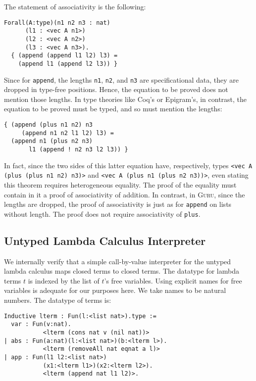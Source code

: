 \documentclass[preprint,natbib]{sigplanconf}
\newcommand{\guru}[0]{\textsc{Guru}}
\begin{document}
The statement of associativity is the following:

{\begin{verbatim}
Forall(A:type)(n1 n2 n3 : nat)
      (l1 : <vec A n1>)
      (l2 : <vec A n2>)
      (l3 : <vec A n3>).
  { (append (append l1 l2) l3) =
    (append l1 (append l2 l3)) }
\end{verbatim}}

\noindent Since for \texttt{append}, the lengths
\texttt{n1}, \texttt{n2}, and \texttt{n3} are specificational data,
they are dropped in type-free positions.  Hence, the equation to be
proved does not mention those lengths.  In type theories like Coq's or
Epigram's, in contrast, the equation to be proved must be typed, and
so must mention the lengths:

{\begin{verbatim}
{ (append (plus n1 n2) n3
     (append n1 n2 l1 l2) l3) =
  (append n1 (plus n2 n3)
       l1 (append ! n2 n3 l2 l3)) }
\end{verbatim}}

\noindent In fact, since the two sides of this latter equation have,
respectively, types \texttt{<vec A (plus (plus n1 n2) n3)>} and
\texttt{<vec A (plus n1 (plus n2 n3))>}, even stating this theorem
requires heterogeneous equality.  The proof of the equality must
contain in it a proof of associativity of addition.  In contrast, in
\guru, since the lengths are dropped, the proof of associativity is
just as for \texttt{append} on lists without length.  The proof does
not require associativity of \texttt{plus}.

\subsection{Untyped Lambda Calculus Interpreter} 

We internally verify that a simple call-by-value interpreter for the
untyped lambda calculus maps closed terms to closed terms.  The
datatype for lambda terms $t$ is indexed by the list of $t$'s free
variables.  Using explicit names for free variables is adequate for
our purposes here.  We take names to be natural numbers.  The datatype
of terms is:

\begin{verbatim}
Inductive lterm : Fun(l:<list nat>).type :=
  var : Fun(v:nat).
           <lterm (cons nat v (nil nat))>
| abs : Fun(a:nat)(l:<list nat>)(b:<lterm l>).
           <lterm (removeAll nat eqnat a l)>
| app : Fun(l1 l2:<list nat>)
           (x1:<lterm l1>)(x2:<lterm l2>).
           <lterm (append nat l1 l2)>.
\end{verbatim}
\end{document}
